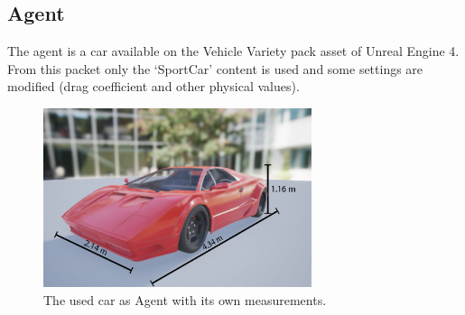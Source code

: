\documentclass[14pt]{extarticle}
\def\sp{\vspace{5pt}}
\begin{document}
\begin{flushleft}
	\subsection{Agent}
	\sp
	The agent is a car available on the Vehicle Variety pack \cite{VVp} asset of Unreal Engine 4. From this packet only the `SportCar' content is used and some settings are modified (drag coefficient and other physical values).
	\begin{figure}[H]
    		\centering\includegraphics[width=0.7\textwidth]{./Image/Agent/car.png}
		\vspace{5mm}
    		\caption{The used car as Agent with its own measurements.}
	\end{figure}
	

\end{flushleft}
\end{document}
